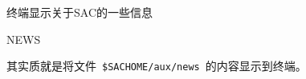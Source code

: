 \label{cmd:news}

终端显示关于SAC的一些信息

\begin{SACSTX}
NEWS
\end{SACSTX}

其实质就是将文件~\verb+$SACHOME/aux/news+~的内容显示到终端。
